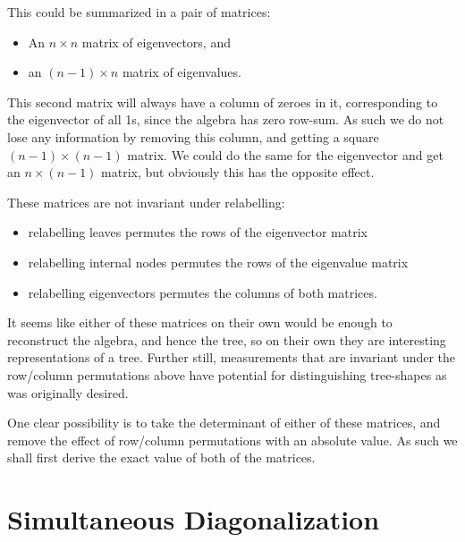 \documentclass[10pt,a4paper]{report}
\begin{document}
This could be summarized in a pair of matrices:
\begin{itemize}
	\item An $n \times n$ matrix of eigenvectors, and
	\item an $(n-1) \times n$ matrix of eigenvalues.
\end{itemize}

This second matrix will always have a column of zeroes in it, corresponding to
the eigenvector of all 1s, since the algebra has zero row-sum.
As such we do not lose any information by removing this column, and getting a
square $(n-1) \times (n-1)$ matrix.
We could do the same for the eigenvector and get an $n \times (n-1)$ matrix,
but obviously this has the opposite effect.

These matrices are not invariant under relabelling:
\begin{itemize}
	\item relabelling leaves permutes the rows of the eigenvector matrix
	\item relabelling internal nodes permutes the rows of the eigenvalue matrix
	\item relabelling eigenvectors permutes the columns of both matrices.
\end{itemize}

It seems like either of these matrices on their own would be enough to
reconstruct the algebra, and hence the tree, so on their own they are
interesting representations of a tree.
Further still, measurements that are invariant under the row/column
permutations above have potential for distinguishing tree-shapes as was
originally desired.

One clear possibility is to take the determinant of either of these matrices,
and remove the effect of row/column permutations with an absolute value.
As such we shall first derive the exact value of both of the matrices.


\chapter{Simultaneous Diagonalization}

%
%
%
%
\end{document}
